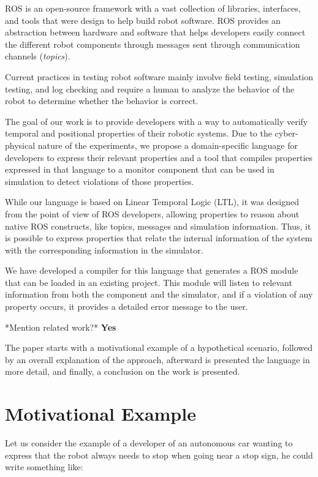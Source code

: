 \documentclass[runningheads]{llncs}
\begin{document}
ROS is an open-source framework with a vast collection of libraries, interfaces, and tools that were design to help build robot software. ROS provides an abstraction between hardware and software that helps developers easily connect the different robot components through messages sent through communication channels (\textit{topics}).

Current practices in testing robot software mainly involve field testing, simulation testing, and log checking and require a human to analyze the behavior of the robot to determine whether the behavior is correct.

The goal of our work is to provide developers with a way to automatically verify temporal and positional properties of their robotic systems. Due to the cyber-physical nature of the experiments, we propose a domain-specific language for developers to express their relevant properties and a tool that compiles properties expressed in that language to a monitor component that can be used in simulation to detect violations of those properties.

While our language is based on Linear Temporal Logic (LTL), it was designed from the point of view of ROS developers, allowing properties to reason about native ROS constructs, like topics, messages and simulation information. Thus, it is possible to express properties that relate the internal information of the system with the corresponding information in the simulator.

We have developed a compiler for this language that generates a ROS module that can be loaded in an existing project. This module will listen to relevant information from both the component and the simulator, and if a violation of any property occurs, it provides a detailed error message to the user.

*Mention related work?* \textbf{Yes}

The paper starts with a motivational example of a hypothetical scenario, followed by an overall explanation of the approach, afterward is presented the language in more detail, and finally, a conclusion on the work is presented.

\section{Motivational Example}

Let us consider the example of a developer of an autonomous car wanting to express that the robot always needs to stop when going near a stop sign, he could write something like:
\end{document}
